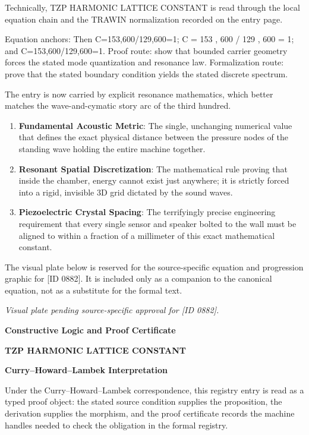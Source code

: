 Technically, TZP HARMONIC LATTICE CONSTANT is read through the local equation chain and the TRAWIN normalization recorded on the entry page.

Equation anchors: Then C=153,600/129,600=1; C = 153 , 600 / 129 , 600 = 1; and C=153,600/129,600=1. Proof route: show that bounded carrier geometry forces the stated mode quantization and resonance law. Formalization route: prove that the stated boundary condition yields the stated discrete spectrum.

The entry is now carried by explicit resonance mathematics, which better matches the wave-and-cymatic story arc of the third hundred.
\endgroup

\begin{enumerate}[leftmargin=1.6em,itemsep=6pt,topsep=4pt]
\item \textbf{Fundamental Acoustic Metric}: The single, unchanging numerical value that defines the exact physical distance between the pressure nodes of the standing wave holding the entire machine together.
\item \textbf{Resonant Spatial Discretization}: The mathematical rule proving that inside the chamber, energy cannot exist just anywhere; it is strictly forced into a rigid, invisible 3D grid dictated by the sound waves.
\item \textbf{Piezoelectric Crystal Spacing}: The terrifyingly precise engineering requirement that every single sensor and speaker bolted to the wall must be aligned to within a fraction of a millimeter of this exact mathematical constant.
\end{enumerate}

\begingroup\footnotesize\sloppy
The visual plate below is reserved for the source-specific equation and progression graphic for [ID 0882]. It is included only as a companion to the canonical equation, not as a substitute for the formal text.
\par\endgroup
\begingroup\footnotesize\itshape
Visual plate pending source-specific approval for [ID 0882].
\par\endgroup

\clearpage
\begingroup\tzpsupportsetup
\noindent\textbf{\fontsize{10.8pt}{12.8pt}\selectfont [ID 0882] Constructive Logic and Proof Certificate}\par
\noindent\textbf{\fontsize{10pt}{12pt}\selectfont TZP HARMONIC LATTICE CONSTANT}\par
\vspace{0.45em}
\begingroup
\footnotesize
\setlength{\parskip}{0.22em}
\setlength{\parindent}{0pt}
\noindent\textbf{Curry--Howard--Lambek Interpretation}\par
Under the Curry--Howard--Lambek correspondence, this registry entry is read as a typed proof
object: the stated source condition supplies the proposition, the derivation supplies the
morphism, and the proof certificate records the machine handles needed to check the obligation
in the formal registry.

